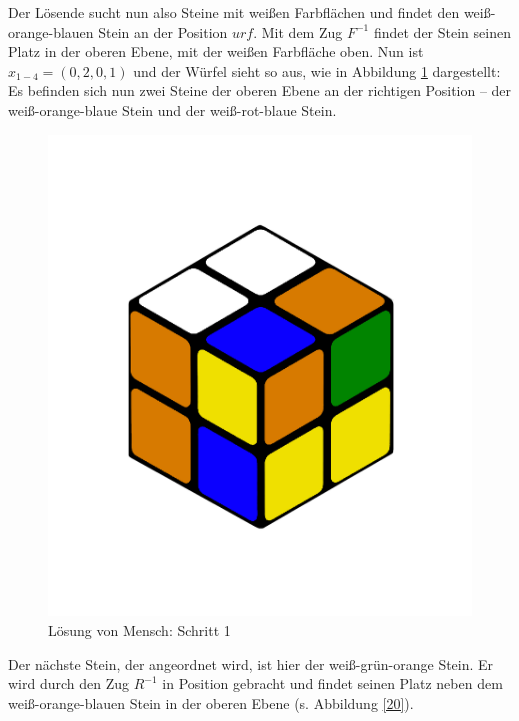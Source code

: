 \documentclass[12pt,a4paper, usenames, dvipsnames]{article}
\theoremstyle{mystyle}
\theoremstyle{definition}
\begin{document}
Der Lösende sucht nun also Steine mit weißen Farbflächen und findet den weiß-orange-blauen Stein an der Position $urf$. 
Mit dem Zug $F^{-1}$ findet der Stein seinen Platz in der oberen Ebene, mit der weißen Farbfläche oben. 
Nun ist $x_{1-4}=(0,2,0,1)$ und der Würfel sieht so aus, wie in Abbildung \ref{19} dargestellt: Es befinden sich nun zwei Steine der oberen Ebene an der richtigen Position -- der weiß-orange-blaue Stein und der weiß-rot-blaue Stein.

\begin{figure}[H]
\centering
\includegraphics[scale=0.12]{0201.png}
\caption[Lösung von Mensch: Schritt 1]{Lösung von Mensch: Schritt 1}
\label{19}
\end{figure}

Der nächste Stein, der angeordnet wird, ist hier der weiß-grün-orange Stein. Er wird durch den Zug $R^{-1}$ in Position gebracht und findet seinen Platz neben dem weiß-orange-blauen Stein in der oberen Ebene (s. Abbildung \ref{20}).
 
\end{document}
